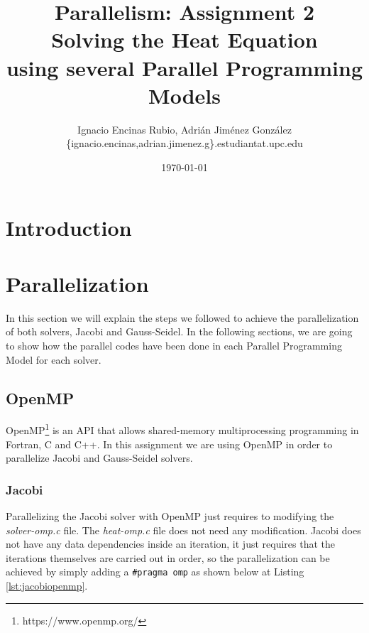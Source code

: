 \documentclass[a4paper, 10pt]{article}
\title{\textbf{Parallelism: Assignment 2\\Solving the Heat Equation \\using several Parallel Programming Models}}
\author{Ignacio Encinas Rubio, Adrián Jiménez González\\\{ignacio.encinas,adrian.jimenez.g\}.estudiantat.upc.edu}
\date{\normalsize\today{}}
\begin{document}
\maketitle

  
  

\section{Introduction}

\section{Parallelization}

In this section we will explain the steps we followed to achieve the parallelization of both solvers, Jacobi and Gauss-Seidel. In the following sections, we are going to show how the parallel codes have been done in each Parallel Programming Model for each solver.

\subsection{OpenMP}

OpenMP\footnote{https://www.openmp.org/} is an API that allows shared-memory multiprocessing programming in Fortran, C and C++. In this assignment we are using OpenMP in order to parallelize Jacobi and Gauss-Seidel solvers.

\subsubsection{Jacobi}

  Parallelizing the Jacobi solver with OpenMP just requires to modifying the \textit{solver-omp.c} file. The \textit{heat-omp.c} file does not need any modification. 
Jacobi does not have any data dependencies inside an iteration, it just requires that the iterations themselves are carried out in order, so the parallelization can be achieved by simply adding a \texttt{\#pragma omp} as shown below at Listing \ref{lst:jacobiopenmp}.
\end{document}
